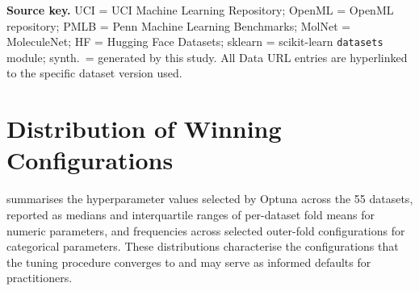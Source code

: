 {{\medskip
\noindent\textbf{Source key.}\quad
UCI = UCI Machine Learning Repository;\;
OpenML = OpenML repository;\;
PMLB = Penn Machine Learning Benchmarks;\;
MolNet = MoleculeNet;\;
HF = Hugging Face Datasets;\;
sklearn = scikit-learn \texttt{datasets} module;\;
synth.\ = generated by this study.
All Data URL entries are hyperlinked to the specific dataset version used.
}
}%



\section{Distribution of Winning Configurations}
\label{sec:winning-configs}

 summarises the hyperparameter values selected by Optuna across the 55 datasets, reported as medians and interquartile ranges of per-dataset fold means for numeric parameters, and frequencies across selected outer-fold configurations for categorical parameters.
These distributions characterise the configurations that the tuning procedure converges to and may serve as informed defaults for practitioners.

